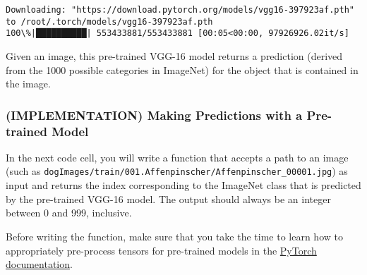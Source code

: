 \documentclass[11pt]{article}
\begin{document}
    \begin{Verbatim}[commandchars=\\\{\}]
Downloading: "https://download.pytorch.org/models/vgg16-397923af.pth" to /root/.torch/models/vgg16-397923af.pth
100\%|██████████| 553433881/553433881 [00:05<00:00, 97926926.02it/s] 

    \end{Verbatim}

    Given an image, this pre-trained VGG-16 model returns a prediction
(derived from the 1000 possible categories in ImageNet) for the object
that is contained in the image.

    \hypertarget{implementation-making-predictions-with-a-pre-trained-model}{%
\subsubsection{(IMPLEMENTATION) Making Predictions with a Pre-trained
Model}\label{implementation-making-predictions-with-a-pre-trained-model}}

In the next code cell, you will write a function that accepts a path to
an image (such as
\texttt{\textquotesingle{}dogImages/train/001.Affenpinscher/Affenpinscher\_00001.jpg\textquotesingle{}})
as input and returns the index corresponding to the ImageNet class that
is predicted by the pre-trained VGG-16 model. The output should always
be an integer between 0 and 999, inclusive.

Before writing the function, make sure that you take the time to learn
how to appropriately pre-process tensors for pre-trained models in the
\href{http://pytorch.org/docs/stable/torchvision/models.html}{PyTorch
documentation}.
\end{document}
